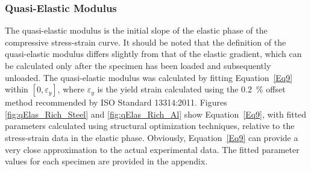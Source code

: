 \documentclass[review]{elsarticle}
\begin{document}
\subsubsection{Quasi-Elastic Modulus}

The quasi-elastic modulus is the initial slope of the elastic phase of the compressive stress-strain curve. It should be noted that the definition of the quasi-elastic modulus differs slightly from that of the elastic gradient, which can be calculated only after the specimen has been loaded and subsequently unloaded. The quasi-elastic modulus was calculated by fitting Equation~\ref{Eq9} within $[0, \varepsilon_y]$, where $\varepsilon_y$ is the yield strain calculated using the 0.2~\% offset method recommended by ISO Standard 13314:2011. Figures \ref{fig:qElas_Rich_Steel} and \ref{fig:qElas_Rich_Al} show Equation~\ref{Eq9}, with fitted parameters calculated using structural optimization techniques, relative to the stress-strain data in the elastic phase. Obviously, Equation~\ref{Eq9} can provide a very close approximation to the actual experimental data. The fitted parameter values for each specimen are provided in the appendix.
\end{document}
